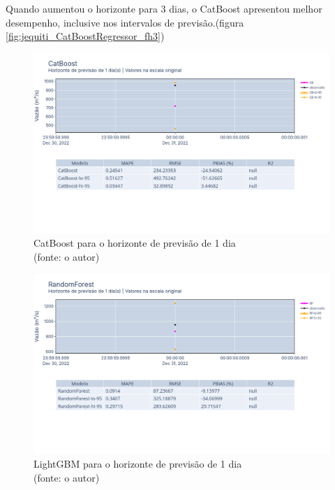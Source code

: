 Quando aumentou o horizonte para 3 dias, o CatBoost apresentou melhor desempenho, inclusive nos intervalos de previsão.(figura \ref{fig:jequiti_CatBoostRegressor_fh3})

\begin{figure}[!h]
	\centering
	\includegraphics[scale=0.33]{Figuras/jequiti/resultados/CatBoost_fh1.png}
	\caption{CatBoost para o horizonte de previsão de 1 dia\\(fonte: o autor)}
	\label{fig:jequiti_CatBoostRegressor_fh1}
\end{figure}

\begin{figure}[!h]
	\centering
	\includegraphics[scale=0.33]{Figuras/jequiti/resultados/RandomForest_fh1.png}
	\caption{LightGBM para o horizonte de previsão de 1 dia\\(fonte: o autor)}
	\label{fig:jequiti_LGBMRegressor_fh1}
\end{figure}

